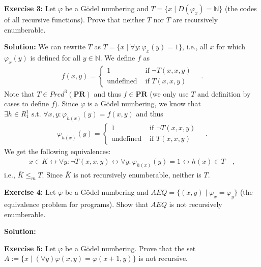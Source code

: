 \documentclass [11pt]{article}
\newcommand{\N}{\ensuremath{\mathbb{N}}}
\newcommand{\PR}{\textbf{PR}}
\newcommand{\lra}{\ensuremath{\leftrightarrow}}
\begin{document}
\bigskip
\noindent
\textbf{Exercise 3:} Let $\varphi$ be a G\"odel numbering and $T = \{ x \mid D(\varphi_x) = \N\}$ (the codes of all recursive functions). Prove that neither $T$ nor $\overline{T}$ are recursively enumberable.

\noindent
\textbf{Solution:}
We can rewrite $T$ as $T = \{ x \mid \forall y: \varphi_x(y) = 1 \}$, i.e., all $x$  for which $\varphi_x(y)$ is defined for all $y \in \N$.
We define $f$ as 
\begin{align*}
 f(x,y) = \begin{cases}
           1 & \text{ if } \neg T(x,x,y) \\
           \text{undefined} &\text{ if } T(x,x,y)
          \end{cases} \quad .
\end{align*} 
Note that $T \in Pred^3(\PR)$ and thus $f \in \PR$ (we only use $T$ and definition by cases to define $f$).
Since $\varphi$ is a G\"odel numbering, we know that $\exists h \in R_1^1 \text{ s.t.\ } \forall x,y :\varphi_{h(x)}(y) = f(x,y)$ and thus
\begin{align*}
\varphi_{h(x)}(y) = \begin{cases}
           1 & \text{ if } \neg T(x,x,y) \\
           \text{undefined} &\text{ if } T(x,x,y)
          \end{cases} \quad .
\end{align*} 
We get the following equivalences:
\begin{align*}
x\in K \lra \forall y: \neg T(x,x,y) \lra \forall y: \varphi_{h(x)}(y) = 1 \lra h(x) \in T \quad , 
\end{align*}
i.e., $\overline{K} \leq_m T$. 
Since $\overline{K}$ is not recursively enumberable, neither is $T$.

\bigskip
\noindent
\textbf{Exercise 4:} Let $\varphi$ be a G\"odel numbering and $AEQ = \{(x,y) \mid \varphi_x = \varphi_y \}$ (the equivalence problem for programs). Show that $AEQ$ is not recursively enumberable.

\noindent
\textbf{Solution:}

\bigskip
\noindent
\textbf{Exercise 5:} Let $\varphi$ be a G\"odel numbering. Prove that the set $A:= \{x \mid (\forall y)\varphi(x,y) = \varphi(x+1,y)\}$ is not recursive.
\end{document}
